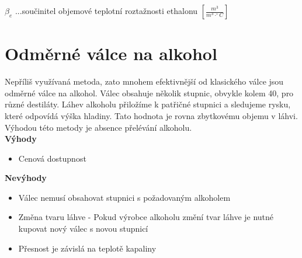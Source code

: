 \(\beta_e\) ...součinitel objemové teplotní roztažnosti ethalonu \([\frac{m^3}{m^3 \cdot ^\circ C}]\)




\section{Odměrné válce na alkohol}
\label{valec_na_alkohol}

Nepříliš využívaná metoda, zato mnohem efektivnější od klasického válce jsou odměrné válce na alkohol. Válec obsahuje několik stupnic, obvykle kolem 40, pro různé destiláty. Láhev alkoholu přiložíme k patřičné stupnici a sledujeme rysku, které odpovídá výška hladiny. Tato hodnota je rovna zbytkovému objemu v láhvi. Výhodou této metody je absence přelévání alkoholu.\\



\textbf{Výhody}
\begin{itemize}
    \item Cenová dostupnost\\
\end{itemize}

\textbf{Nevýhody}
\begin{itemize}
    \item Válec nemusí obsahovat stupnici s požadovaným alkoholem
    \item Změna tvaru láhve - Pokud výrobce alkoholu změní tvar láhve je nutné kupovat nový válec s novou stupnicí
    \item Přesnost je závislá na teplotě kapaliny
\end{itemize}

